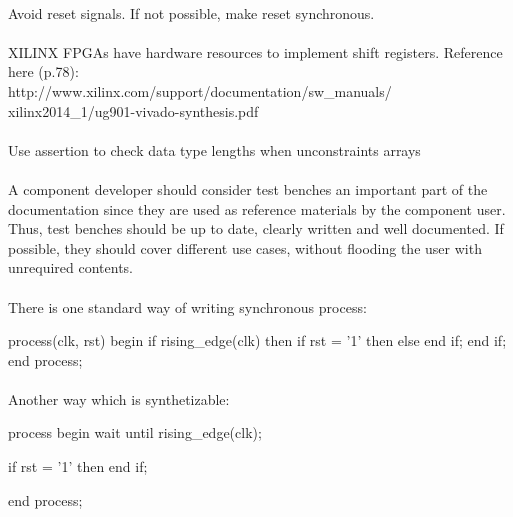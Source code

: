 \documentclass[12pt]{article}
\begin{document}
\paragraph{}
Avoid reset signals. If not possible, make reset synchronous.


\paragraph{}
XILINX FPGAs have hardware resources to implement shift registers.
Reference here (p.78):\\
\longurl
{http://www.xilinx.com/support/documentation/sw_manuals/}
{xilinx2014_1/ug901-vivado-synthesis.pdf}



\paragraph{}
Use assertion to check data type lengths when unconstraints
arrays



\paragraph{}
A component developer should consider test benches an important
part of the documentation since they are used as reference
materials by the component user. Thus, test benches should be up
to date, clearly written and well documented. If possible, they
should cover different use cases, without flooding the user with
unrequired contents.



\paragraph{}
There is one standard way of writing synchronous process:
\begin{vhdl}
process(clk, rst)
begin
 if rising_edge(clk) then
  if rst = '1' then
  else
  end if;
 end if;
end process;
\end{vhdl}

\paragraph{}
Another way which is synthetizable:
\begin{vhdl}
process
begin
 wait until rising_edge(clk);

 if rst = '1' then
 end if;

end process;
\end{vhdl}
\end{document}
